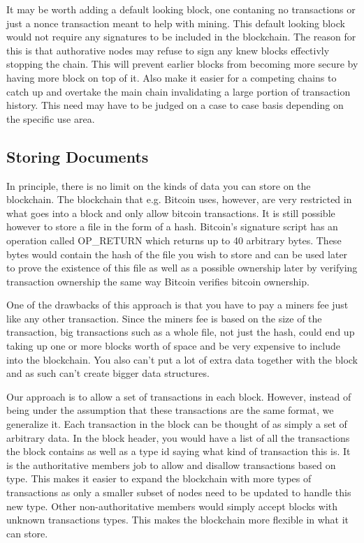 \documentclass[12pt]{article}
\begin{document}
It may be worth adding a default looking block, one contaning no transactions or just a nonce transaction meant to help with mining. This default looking block would not require any signatures to be included in the blockchain. The reason for this is that authorative nodes may refuse to sign any knew blocks effectivly stopping the chain. This will prevent earlier blocks from becoming more secure by having more block on top of it. Also make it easier for a competing chains to catch up and overtake the main chain invalidating a large portion of transaction history. This need may have to be judged on a case to case basis depending on the specific use area.

\subsection{Storing Documents}

In principle, there is no limit on the kinds of data you can store on the blockchain. The blockchain that e.g. Bitcoin uses, however, are very restricted in what goes into a block and only allow bitcoin transactions. It is still possible however to store a file in the form of a hash. Bitcoin's signature script has an operation called OP\_RETURN which returns up to 40 arbitrary bytes. These bytes would contain the hash of the file you wish to store and can be used later to prove the existence of this file as well as a possible ownership later by verifying transaction ownership the same way Bitcoin verifies bitcoin ownership.

One of the drawbacks of this approach is that you have to pay a miners fee just like any other transaction. Since the miners fee is based on the size of the transaction, big transactions such as a whole file, not just the hash, could end up taking up one or more blocks worth of space and be very expensive to include into the blockchain. You also can't put a lot of extra data together with the block and as such can't create bigger data structures.

Our approach is to allow a set of transactions in each block. However, instead of being under the assumption that these transactions are the same format, we generalize it. Each transaction in the block can be thought of as simply a set of arbitrary data. In the block header, you would have a list of all the transactions the block contains as well as a type id saying what kind of transaction this is. It is the authoritative members job to allow and disallow transactions based on type. This makes it easier to expand the blockchain with more types of transactions as only a smaller subset of nodes need to be updated to handle this new type. Other non-authoritative members would simply accept blocks with unknown transactions types. This makes the blockchain more flexible in what it can store.
\end{document}
